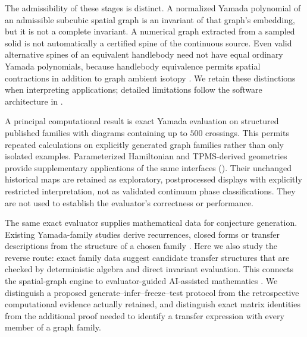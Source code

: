 \documentclass[10pt,twocolumn]{article}
\begin{document}
The admissibility of these stages is distinct. A normalized Yamada polynomial of an admissible subcubic spatial graph is an invariant of that graph's embedding, but it is not a complete invariant. A numerical graph extracted from a sampled solid is not automatically a certified spine of the continuous source. Even valid alternative spines of an equivalent handlebody need not have equal ordinary Yamada polynomials, because handlebody equivalence permits spatial contractions in addition to graph ambient isotopy \cite{kg_ishii2012handlebody}. We retain these distinctions when interpreting applications; detailed limitations follow the software architecture in .

A principal computational result is exact Yamada evaluation on structured published families with diagrams containing up to $500$ crossings. This permits repeated calculations on explicitly generated graph families rather than only isolated examples. Parameterized Hamiltonian and TPMS-derived geometries provide supplementary applications of the same interfaces (). Their unchanged historical maps are retained as exploratory, postprocessed displays with explicitly restricted interpretation, not as validated continuum phase classifications. They are not used to establish the evaluator's correctness or performance.

The same exact evaluator supplies mathematical data for conjecture generation. Existing Yamada-family studies derive recurrences, closed forms or transfer descriptions from the structure of a chosen family \cite{kg_dobrynin1996yamada,kg_li2018yamada,kg_lundstrom2022transfer}. Here we also study the reverse route: exact family data suggest candidate transfer structures that are checked by deterministic algebra and direct invariant evaluation. This connects the spatial-graph engine to evaluator-guided AI-assisted mathematics \cite{kg_funsearch2024,kg_alphaevolve2025,kg_georgiev2025mathematical}. We distinguish a proposed generate--infer--freeze--test protocol from the retrospective computational evidence actually retained, and distinguish exact matrix identities from the additional proof needed to identify a transfer expression with every member of a graph family.
\end{document}
